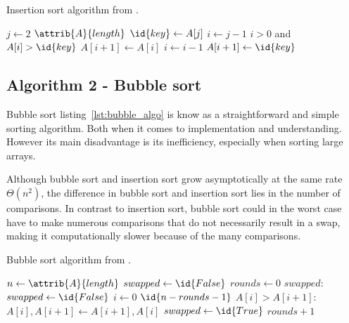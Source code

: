 \documentclass[sigconf, nonacm, natbib, screen, balance=False]{acmart}
\begin{document}
\begin{listing}
  \caption{Insertion sort algorithm from \citet[Ch.~2.1]{CLRS}.}
  \label{lst:insertion_algo}

  \begin{codebox}
    \li \For $j \gets 2$ \To $\attrib{A}{length}$
    \li \Do
    $\id{key} \gets A[j]$
    \li     $i \gets j-1$
    \li      \While $i>0$ and $A[i] > \id{key}$
    \li      \Do
    $A[i+1] \gets A[i]$
    \li         $i \gets i-1$
    \End    
    \li       $A[i+1]\gets \id{key}$
    \End
  \end{codebox}
\end{listing}

\subsection{Algorithm 2 - Bubble sort}\label{sec:algo2}

Bubble sort listing~\ref{lst:bubble_algo} is know as a straightforward and simple sorting algorithm. Both when it comes to implementation and understanding. However its main disadvantage is its inefficiency, especially when sorting large arrays.

Although bubble sort and insertion sort grow asymptotically at the same rate $\Theta(n^2)$, the difference in bubble sort and insertion sort lies in the number of comparisons. In contrast to insertion sort, bubble sort could in the worst case have to make numerous comparisons that do not necessarily result in a swap, making it computationally slower because of the many comparisons. 

\begin{listing}
  \caption{Bubble sort algorithm from \citet[Ch.~2.1]{CLRS_2009}.}
  \label{lst:bubble_algo}

  \begin{codebox}
    \li $n \gets \attrib{A}{length}$
    \li $swapped \gets \id{False}$
    \li $rounds \gets 0$
    \li \While $swapped:$
    \li \Do
    $swapped \gets \id{False}$
    \li \For $i \gets 0 $ \To $\id{n - rounds - 1}$
    \li     \Do
    \If $A[i] > A[i+1]:$
    \li     \Do
    $A[i], A[i+1] \gets A[i+1], A[i]$
    \li $swapped \gets \id{True}$
    \End
    \End    
    \li $rounds + 1$
    \End
  \end{codebox}
\end{listing}
\end{document}
